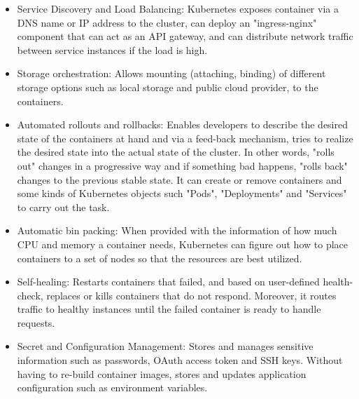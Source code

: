 \documentclass{Configuration_Files/PoliMi3i_thesis}
\begin{document}
\begin{itemize}
    \item Service Discovery and Load Balancing: Kubernetes exposes container via a DNS name or IP address to the cluster, can deploy an "ingress-nginx" component that can act as an API gateway, and can distribute network traffic between service instances if the load is high.
    
    \item Storage orchestration: Allows mounting (attaching, binding) of different storage options such as local storage and public cloud provider, to the containers.
    
    \item Automated rollouts and rollbacks: Enables developers to describe the desired state of the containers at hand and via a feed-back mechanism, tries to realize the desired state into the actual state of the cluster. In other words, "rolls out" changes in a progressive way and if something bad happens, "rolls back" changes to the previous stable state. It can create or remove containers and some kinds of Kubernetes objects such "Pods", "Deployments" and "Services" to carry out the task.
    
    \item Automatic bin packing: When provided with the information of how much CPU and memory a container needs, Kubernetes can figure out how to place containers to a set of nodes so that the resources are best utilized.
    
    \item Self-healing: Restarts containers that failed, and based on user-defined health-check, replaces or kills containers that do not respond. Moreover, it routes traffic to healthy instances until the failed container is ready to handle requests.
    
    \item Secret and Configuration Management: Stores and manages sensitive information such as passwords, OAuth access token and SSH keys. Without having to re-build container images, stores and updates application configuration such as environment variables.
\end{itemize}
\end{document}

